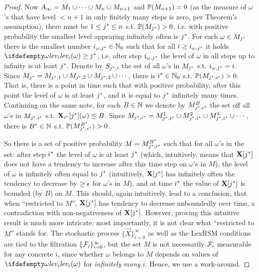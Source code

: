 \begin{proof}
Now $A_{\infty}=M_1\cup\dots\cup M_n\cup M_{n+1}$ and $\mathbb{P}(M_{n+1})=0$ (as the measure of $\omega$'s that have level $<n+1$ in only finitely many steps is zero, per Theorem's assumption), there must be $1\leq {j}^* \leq n$ 
s.t. $\mathbb{P}(M_{{j}^*})>0$, i.e. with positive probability the smallest level appearing infinitely often is ${j}^*$. For each $\omega\in M_{{j}^*}$ there is the smallest number
${i}_{\omega,{j}^*}\in\mathbb{N}_0$ such that for all $i\geq {i}_{\omega,{j}^*}$ it holds 
$\levelrank{\omega}{i}\geq \fixn{j}$, i.e. after step ${i}_{\omega,{j}^*}$ the level of $\omega$ in all steps up to infinity is at least ${j}^*$. Denote by $S_{{j}^*,{i}}$ the set of all $\omega$'s in $M_{{j}^*}$ s.t. 
$i_{\omega,{j}^*}={i}$. 
Since $M_{{j}^*} = M_{{j}^*,1} \cup M_{{j}^*,2} \cup M_{{j}^*,3} \cup \cdots$, there is ${i}^*\in 
\mathbb{N}_0$ 
s.t. 
$\mathbb{P}(M_{{j}^*,{i}^*})>0$. That is, there is a point in time such that with positive probability, after this point the level of $\omega$ is at least ${j}^*$, and it is equal to ${j}^*$ infinitely many times. Continuing on the same note, for each $B\in \mathbb{N}$ we 
denote by $M_{{j}^*,{i}^*}^{B}$ the set off all $\omega$'s in $M_{{j}^*,{i}^*}$ s.t. 
$\mathbf{X}_{{i}^*}[{j}^*](\omega)\leq B$. Since $M_{{j}^*,{i}^*}= M_{{j}^*,{i}^*}^{1} \cup M_{{j}^*,{i}^*}^{2} 
\cup M_{{j}^*,{i}^*}^{3} \cup \cdots  $, there is ${B}^*\in \mathbb{N}$ s.t. 
$\mathbb{P}(M_{{j}^*,{i}^*}^{{B}^*})>0$. 

So there is a set of positive probability $M=M_{{j}^*,{i}^*}^{{B}^*}$  such that for all $\omega$'s in the set: after step ${i}^*$ the level of $\omega$ is at least ${j}^*$ (which, intuitively, means that $\mathbf{X}[{j}^*]$ does not have a tendency to increase after this time step on $\omega$'s in $M$), the level of $\omega$ is infinitely often equal to ${j}^*$ (intuitively, $\mathbf{X}[{j}^*]$ has infinitely often the tendency to decrease by $\geq \epsilon$ for $\omega$'s in $M$), and at time ${i}^*$ the value of $\mathbf{X}[{j}^*]$ is bounded (by $B$) on $M$. This should, again intuitively, lead to a conclusion, that when ``restricted to $M$'', $\mathbf{X}[{j}^*]$ has tendency to decrease unboundedly over time, a contradiction with non-negativeness of $\mathbf{X}[{j}^*]$. However, proving this intuitive result is much more intricate: most importantly, it is not clear what ``restricted to $M$'' stands for. The stochastic process $\{\vec{X}\}_{i=0}^{\infty}$ as well as the LexRSM conditions are tied to the filtration $\{\mathcal{F}_i\}_{i=0}^{\infty}$, but the set $M$ is not necessarily $\mathcal{F}_i$ measurable for any concrete $i$, since whether $\omega$ belongs to $M$ depends on values of $\levelrank{\omega}{i}$ for \emph{infinitely many $i$}. Hence, we use a work-around.


\end{proof}
